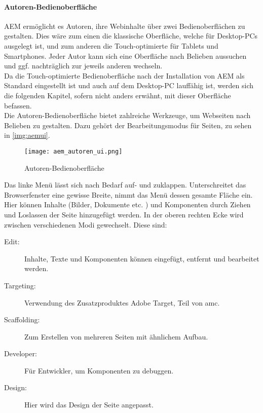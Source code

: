 \paragraph{Autoren-Bedienoberfläche}
\label{sec:autor_ui}
AEM ermöglicht es Autoren, ihre Webinhalte über zwei Bedienoberflächen zu gestalten. Dies wäre zum einen die klassische Oberfläche, welche für Desktop-PCs ausgelegt ist, und zum anderen die Touch-optimierte für Tablets und Smartphones. Jeder Autor kann sich eine Oberfläche nach Belieben aussuchen und ggf. nachträglich zur jeweils anderen wechseln.\\
Da die Touch-optimierte Bedienoberfläche nach der Installation von AEM als Standard eingestellt ist und auch auf dem Desktop-PC lauffähig ist, werden sich die folgenden Kapitel, sofern nicht anders erwähnt, mit dieser Oberfläche befassen. \\
Die Autoren-Bedienoberfläche bietet zahlreiche Werkzeuge, um Webseiten nach Belieben zu gestalten. Dazu gehört der Bearbeitungsmodus für Seiten, zu sehen in \autoref{img:aemui}.

\begin{figure}[H]
	\begin{center}
      	\texttt{[image: aem\_autoren\_ui.png]}
		\caption{Autoren-Bedienoberfläche}
		\label{img:aemui}
	\end{center}
\end{figure}

Das linke Menü lässt sich nach Bedarf auf- und zuklappen. Unterschreitet das Browserfenster eine gewisse Breite, nimmt das Menü dessen gesamte Fläche ein. Hier können Inhalte (Bilder, Dokumente etc. ) und Komponenten durch Ziehen und Loslassen der Seite hinzugefügt werden. In der oberen rechten Ecke wird zwischen verschiedenen Modi gewechselt. Diese sind:

\begin{description}
	\item[Edit:] Inhalte, Texte und Komponenten können eingefügt, entfernt und bearbeitet werden.
	\item[Targeting:] Verwendung des Zusatzproduktes Adobe Target, Teil von \ac{amc}.
	\item[Scaffolding:] Zum Erstellen von mehreren Seiten mit ähnlichem Aufbau.
	\item[Developer:] Für Entwickler, um Komponenten zu debuggen.
	\item[Design:] Hier wird das Design der Seite angepasst.
\end{description}

